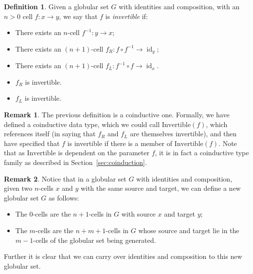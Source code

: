 \documentclass{article}
\theoremstyle{definition}
\newtheorem{definition}{Definition}
\newtheorem{remark}{Remark}
\theoremstyle{examplestyle}
\DeclareMathOperator{\id}{id}
\newcommand{\inv}[1]{#1^{-1}}
\begin{document}
\begin{definition}
  Given a globular set \(G\) with identities and composition, with an \(n > 0\) cell \(f : x \to y\), we say that \(f\) is \emph{invertible} if:
  \begin{itemize}
  \item There exists an \(n\)-cell \(\inv f : y \to x\);
  \item There exists an \((n+1)\)-cell \(f_R: f \circ \inv f \to \id_y\);
  \item There exists an \((n+1)\)-cell \(f_L: \inv f \circ f \to \id_x\).
  \item \(f_R\) is invertible.
  \item \(f_L\) is invertible.
  \end{itemize}
\end{definition}

\begin{remark}
  The previous definition is a coinductive one. Formally, we have defined a coinductive data type, which we could call \(\text{Invertible}(f)\), which references itself (in saying that \(f_R\) and \(f_L\) are themselves invertible), and then have specified that \(f\) is invertible if there is a member of \(\text{Invertible}(f)\). Note that as \(\text{Invertible}\) is dependent on the parameter \(f\), it is in fact a coinductive type family as described in Section~\ref{sec:coinduction}.
\end{remark}

\begin{remark}\label{descendants}
  Notice that in a globular set \(G\) with identities and composition, given two \(n\)-cells \(x\) and \(y\) with the same source and target, we can define a new globular set \(G\) as follows:
  \begin{itemize}
  \item The \(0\)-cells are the \(n+1\)-cells in \(G\) with source \(x\) and target \(y\);
  \item The \(m\)-cells are the \(n+m+1\)-cells in \(G\) whose source and target lie in the \(m-1\)-cells of the globular set being generated.
  \end{itemize}
  Further it is clear that we can carry over identities and composition to this new globular set.
\end{remark}
\end{document}
